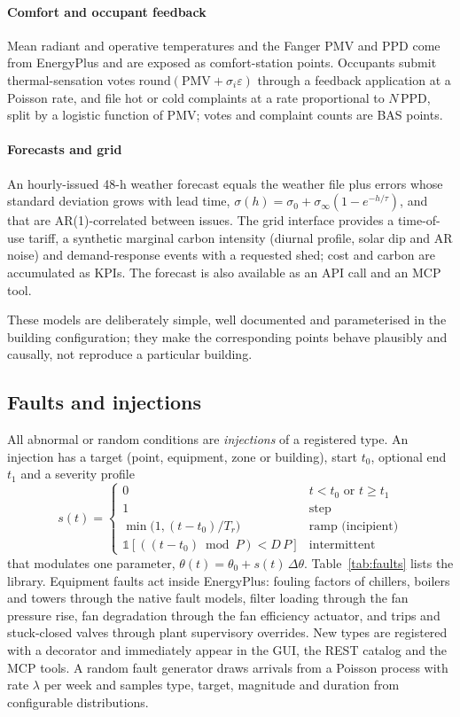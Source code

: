 \documentclass[preprint,12pt,authoryear=false]{elsarticle}
\begin{document}
\paragraph{Comfort and occupant feedback} Mean radiant and operative temperatures and the Fanger PMV and PPD
\cite{iso7730} come from EnergyPlus and are exposed as comfort-station points. Occupants submit thermal-sensation
votes $\mathrm{round}(\mathrm{PMV} + \sigma_i\varepsilon)$ through a feedback application at a Poisson rate, and file
hot or cold complaints at a rate proportional to $N\,\mathrm{PPD}$, split by a logistic function of PMV; votes and
complaint counts are BAS points.

\paragraph{Forecasts and grid} An hourly-issued 48-h weather forecast equals the weather file plus errors whose standard
deviation grows with lead time, $\sigma(h)=\sigma_0+\sigma_\infty(1-e^{-h/\tau})$, and that are AR(1)-correlated
between issues. The grid interface provides a time-of-use tariff, a synthetic marginal carbon intensity (diurnal
profile, solar dip and AR noise) and demand-response events with a requested shed; cost and carbon are accumulated as
KPIs. The forecast is also available as an API call and an MCP tool.

These models are deliberately simple, well documented and parameterised in the building configuration; they make the
corresponding points behave plausibly and causally, not reproduce a particular building.

\subsection{Faults and injections}

All abnormal or random conditions are \emph{injections} of a registered type. An injection has a target (point,
equipment, zone or building), start $t_0$, optional end $t_1$ and a severity profile
\begin{equation}
s(t)=\begin{cases}0 & t<t_0 \text{ or } t\ge t_1\\ 1 & \text{step}\\ \min\!\big(1,(t-t_0)/T_r\big) & \text{ramp (incipient)}\\
\mathbb{1}\!\left[((t-t_0)\bmod P)<D\,P\right] & \text{intermittent}\end{cases}
\end{equation}
that modulates one parameter, $\theta(t)=\theta_0+s(t)\,\Delta\theta$. Table~\ref{tab:faults} lists the library.
Equipment faults act inside EnergyPlus: fouling factors of chillers, boilers and towers through the native fault
models, filter loading through the fan pressure rise, fan degradation through the fan efficiency actuator, and trips
and stuck-closed valves through plant supervisory overrides. New types are registered with a decorator and immediately
appear in the GUI, the REST catalog and the MCP tools. A random fault generator draws arrivals from a Poisson process
with rate $\lambda$ per week and samples type, target, magnitude and duration from configurable distributions.
\end{document}
